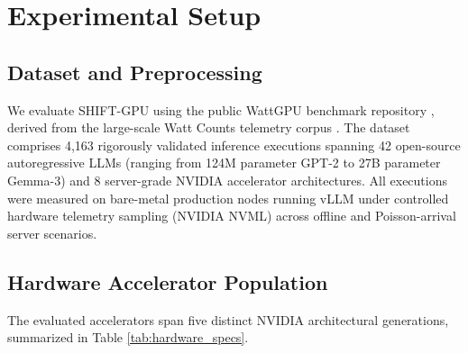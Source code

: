 \documentclass[preprint,12pt]{elsarticle}
\begin{document}
\section{Experimental Setup}
\label{sec:experiments}

\subsection{Dataset and Preprocessing}
We evaluate SHIFT-GPU using the public WattGPU benchmark repository \citep{fadel2026wattgpu}, derived from the large-scale Watt Counts telemetry corpus \citep{fadel2026wattcounts}. The dataset comprises 4,163 rigorously validated inference executions spanning 42 open-source autoregressive LLMs (ranging from 124M parameter GPT-2 to 27B parameter Gemma-3) and 8 server-grade NVIDIA accelerator architectures. All executions were measured on bare-metal production nodes running vLLM under controlled hardware telemetry sampling (NVIDIA NVML) across offline and Poisson-arrival server scenarios.

\subsection{Hardware Accelerator Population}
The evaluated accelerators span five distinct NVIDIA architectural generations, summarized in Table \ref{tab:hardware_specs}.

\begin{table}[h]
\centering
\caption{Microarchitectural specifications of evaluated server-grade GPU hardware population.}
\label{tab:hardware_specs}
\end{table}
\end{document}
